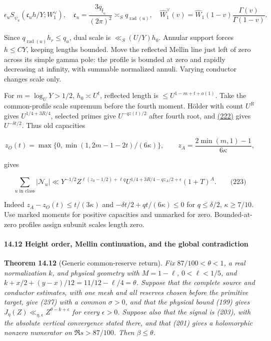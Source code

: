 \[
\epsilon_u S_{\overline{\psi_u}}
 \left(\mathfrak c_u h/Y;W_1^\vee\right),\quad
 \mathfrak c_u=\frac{3q_{\mathfrak f_u}}{(2\pi)^2}
 \asymp_S q_{\operatorname{rad}(u)},\quad
 \widehat W_1^\vee(v)=\widehat W_1(1-v)\frac{\Gamma(v)}{\Gamma(1-v)}.
\]

Since \(q_{\operatorname{rad}(u)}h_r\le q_u\), dual scale is \(\ll_S(U/Y)h_0\). Annular support forces \(h\le CY\), keeping lengths bounded. Move the reflected Mellin line just left of zero across its simple gamma pole: the profile is bounded at zero and rapidly decreasing at infinity, with summable normalized annuli. Varying conductor changes scale only.

For \(m=\log_UY>1/2\), \(h_0\asymp U^t\), reflected length is \(\le U^{1-m+t+o(1)}\). Take the common-profile scale supremum before the fourth moment. Hölder with count \(U^R\) gives \(U^{1/4+3R/4}\), selected primes give \(U^{-qz(t)/2}\) after fourth root, and \protect\hyperlink{dr:mass}{(222)} gives \(U^{-\delta t/2}\). Thus old capacities

\[
z_O(t)=\max\{0,\min(1,2m-1-2t)/(6\kappa)\},
 \qquad z_A=\frac{2\min(m,1)-1}{6\kappa},
\]

gives

\hypertarget{dr:old-numerator}{}

\label{dr:old-numerator}

\[
\sum_{u\text{ in class}}|\mathcal N_u|
 \ll Y^{-1/2}Z^{\ell(z_0-1/2)+\ell q}
 U^{1/4+3R/4-qz_A/2+\epsilon}(1+T)^A.
 \qquad\text{(223)}
\]

Indeed \(z_A-z_O(t)\le t/(3\kappa)\) and \(-\delta t/2+qt/(6\kappa)\le0\) for \(q\le\delta/2\), \(\kappa\ge7/10\). Use marked moments for positive capacities and unmarked for zero. Bounded-at-zero profiles assign subunit scales length zero.

\hypertarget{dr:stage60}{}

\label{dr:stage60}

\hypertarget{height-order-mellin-continuation-and-the-global-contradiction}{%
\paragraph{14.12 Height order, Mellin continuation, and the global contradiction}\label{height-order-mellin-continuation-and-the-global-contradiction}}

\textbf{Theorem 14.12} (Generic common-reserve return).
\emph{Fix \(87/100<\theta<1\), a real normalization \(k\), and physical
geometry with \(M=1-\ell\), \(0<\ell<1/5\), and
\(k+x/2+(y-x)/12=11/12-\ell/4=\theta\).
Suppose that the complete source and conductor estimates, with one mesh
and all reserves chosen before the primitive target, give (237) with a
common \(\sigma>0\), and that the physical bound (199) gives
\(J_\eta(Z)\ll_{\eta,\epsilon}Z^{\theta-k+\epsilon}\) for every
\(\epsilon>0\). Suppose also that the signal is (203), with the absolute
vertical convergence stated there, and that (201) gives a holomorphic
nonzero numerator on \(\Re s>87/100\). Then \(\beta\le\theta\).}

